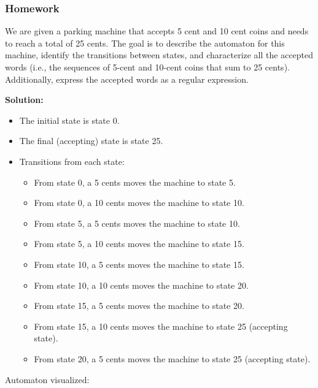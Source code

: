 \documentclass{article}
\theoremstyle{theorem}
\theoremstyle{definition}
\theoremstyle{remark}
\begin{document}
\subsubsection{Homework}

We are given a parking machine that accepts 5 cent and 10 cent coins and needs to reach a total of 25 cents. The goal is to describe the automaton for this machine, identify the transitions between states, and characterize all the accepted words (i.e., the sequences of 5-cent and 10-cent coins that sum to 25 cents). Additionally, express the accepted words as a regular expression.

\textbf{Solution:}



\begin{itemize}
    \item The initial state is state 0.
    \item The final (accepting) state is state 25.
    \item Transitions from each state:
    \begin{itemize}
        \item From state 0, a 5 cents moves the machine to state 5.
        \item From state 0, a 10 cents moves the machine to state 10.
        \item From state 5, a 5 cents moves the machine to state 10.
        \item From state 5, a 10 cents moves the machine to state 15.
        \item From state 10, a 5 cents moves the machine to state 15.
        \item From state 10, a 10 cents moves the machine to state 20.
        \item From state 15, a 5 cents moves the machine to state 20.
        \item From state 15, a 10 cents moves the machine to state 25 (accepting state).
        \item From state 20, a 5 cents moves the machine to state 25 (accepting state).
    \end{itemize}
\end{itemize}


Automaton visualized:
\end{document}
